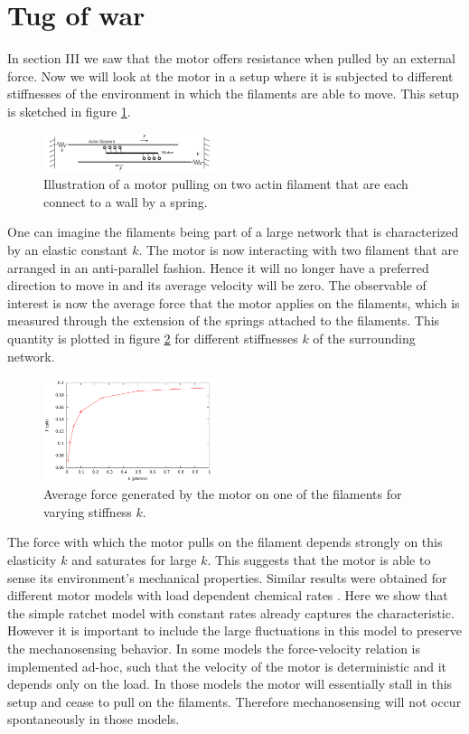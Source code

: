 \documentclass[aps,pre,twocolumn,showpacs,showkeys,a4paper]{revtex4}
\begin{document}
\section{Tug of war}
In  section III we saw that the motor offers resistance when pulled by an external force. 
Now we will look at the motor in a setup where it is subjected to different stiffnesses of the environment in which the filaments are able to move. 
This setup is sketched in figure \ref{Fig: tug}. 
\begin{figure}[t]
\centering
\includegraphics[width=0.45\textwidth,height=!]{tug}
\caption{Illustration of a motor pulling on two actin filament that are each connect to a wall by a spring.}
\label{Fig: tug}
\end{figure}
One can imagine the filaments being part of a large network that is characterized by an elastic constant $k$. 
The motor is now interacting with two filament that are arranged in an anti-parallel fashion. 
Hence it will no longer have a preferred direction to move in and its average velocity will be zero. 
The observable of interest is now the average force that the motor applies on the filaments, which is measured through the extension of the springs attached to the filaments. 
This quantity is plotted in figure \ref{Fig: tug_k} for different stiffnesses $k$ of the surrounding network.
\begin{figure}[t]
\centering
\includegraphics[width=0.45\textwidth,height=!]{tug_k}
\caption{Average force generated by the motor on one of the filaments for varying stiffness $k$.}
\label{Fig: tug_k}
\end{figure}
The force with which the motor pulls on the filament depends strongly on this elasticity $k$ and saturates for large $k$. 
This suggests that the motor is able to sense its environment's mechanical properties.
Similar results were obtained for different motor models with load dependent chemical rates \cite{stam2015isoforms,albert2014stochastic}.
Here we show that the simple ratchet model with constant rates already captures the characteristic. However it is important to include the large fluctuations in this model to preserve the mechanosensing behavior. In some models the force-velocity relation is implemented ad-hoc, such that the velocity of the motor is deterministic and it depends only on the load. In those models the motor will essentially stall in this setup and 
cease to pull on the filaments. Therefore mechanosensing will not occur spontaneously in those models.
\end{document}
